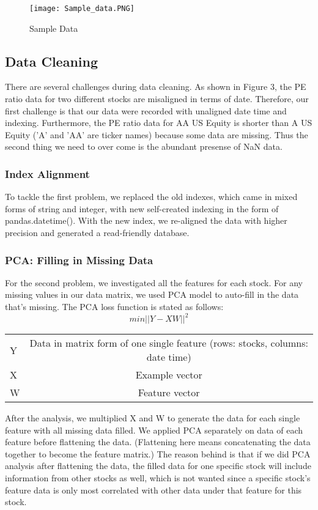 \documentclass[a4paper]{article}
\begin{document}
\begin{figure}
\centering
\texttt{[image: Sample\_data.PNG]}
\caption{\label{fig:sample data}Sample Data}
\end{figure}

\subsection{Data Cleaning}
There are several challenges during data cleaning. As shown in Figure 3, the PE ratio data for two different stocks are misaligned in terms of date. Therefore, our first challenge is that our data were recorded with unaligned date time and indexing. Furthermore, the PE ratio data for AA US Equity is shorter than A US Equity ('A' and 'AA' are ticker names) because some data are missing. Thus the second thing we need to over come is the abundant presense of NaN data.

\subsubsection{Index Alignment}
To tackle the first problem, we replaced the old indexes, which came in mixed forms of string and integer, with new self-created indexing in the form of pandas.datetime(). With the new index, we re-aligned the data with higher precision and generated a read-friendly database.
\subsubsection{PCA: Filling in Missing Data}
For the second problem, we investigated all the features for each stock. For any missing values in our data matrix, we used PCA model to auto-fill in the data that's missing. The PCA loss function is stated as follows:
\begin{equation}
min ||Y-XW||^2
\end{equation}
\begin{center}
\begin{tabular}{ l | c }
 \hline
Y & Data in matrix form of one single feature (rows: stocks, columns: date time)\\
X & Example vector\\
W & Feature vector\\
\hline
 \end{tabular}
\end{center}
After the analysis, we multiplied X and W to generate the data for each single feature with all missing data filled. We applied PCA separately on data of each feature before flattening the data. (Flattening here means concatenating the data together to become the feature matrix.) The reason behind is that if we did PCA analysis after flattening the data, the filled data for one specific stock will include information from other stocks as well, which is not wanted since a specific stock's feature data is only most correlated with other data under that feature for this stock.
\end{document}
